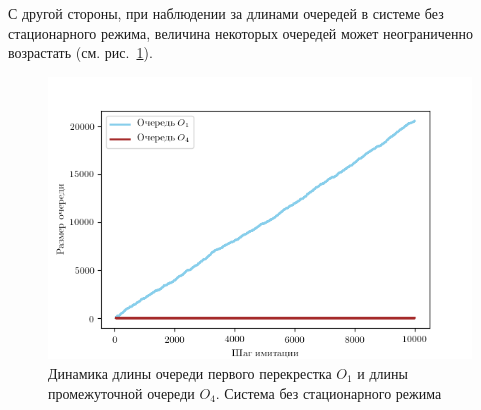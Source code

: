 %
С другой стороны, при наблюдении за длинами очередей в системе без стационарного режима, величина некоторых очередей может неограниченно возрастать (см. рис.~\ref{Experiment:queues:1:nonstationar}).
\begin{figure}[h]
\centering
\includegraphics[scale=1]{Dissertation/Work_structured/Pictures/pic_queues_1.png}
\caption{Динамика длины очереди первого перекрестка $O_1$ и длины промежуточной очереди $O_4$. Система без стационарного режима}
\label{Experiment:queues:1:nonstationar}
\end{figure}

